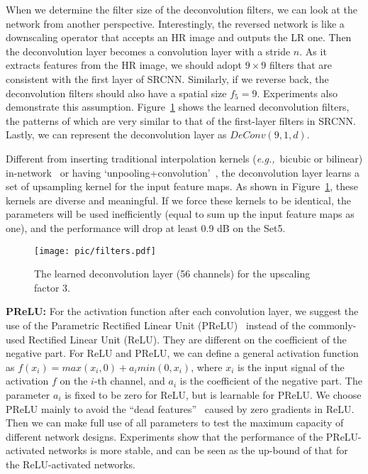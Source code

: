 \documentclass[runningheads]{llncs}
\newcommand{\eg}{\emph{e.g.,}}
\begin{document}
When we determine the filter size of the deconvolution filters, we can look at the network from another perspective. Interestingly, the reversed network is like a downscaling operator that accepts an HR image and outputs the LR one. Then the deconvolution layer becomes a convolution layer with a stride $n$. As it extracts features from the HR image, we should adopt $9\times 9$ filters that are consistent with the first layer of SRCNN. Similarly, if we reverse back, the deconvolution filters should also have a spatial size $f_5=9$. Experiments also demonstrate this assumption. Figure~\ref{fig:filters} shows the learned deconvolution filters, the patterns of which are very similar to that of the first-layer filters in SRCNN.
Lastly, we can represent the deconvolution layer as $DeConv(9,1,d)$.

Different from inserting traditional interpolation kernels (\eg~bicubic or bilinear) in-network~\cite{Long2015} or having `unpooling+convolution'~\cite{dosovitskiy2015learning}, the deconvolution layer learns a set of upsampling kernel for the input feature maps. As shown in Figure~\ref{fig:filters}, these kernels are diverse and meaningful. If we force these kernels to be identical, the parameters will be used inefficiently (equal to sum up the input feature maps as one), and the performance will drop at least 0.9 dB on the Set5.



\begin{figure}[t]
\centering
  \texttt{[image: pic/filters.pdf]}
\caption{The learned deconvolution layer (56 channels) for the upscaling factor 3.}
  \label{fig:filters}
\end{figure}


\noindent
\textbf{PReLU:} For the activation function after each convolution layer, we suggest the use of the Parametric Rectified Linear Unit (PReLU)~\cite{He2015} instead of the commonly-used Rectified Linear Unit (ReLU). They are different on the coefficient of the negative part. For ReLU and PReLU, we can define a general activation function as $f(x_i)=max(x_i,0)+a_imin(0,x_i)$,
where $x_i$ is the input signal of the activation $f$ on the $i$-th channel, and $a_i$ is the coefficient of the negative part. The parameter $a_i$ is fixed to be zero for ReLU, but is learnable for PReLU. We choose PReLU mainly to avoid the ``dead features''~\cite{Zeiler2014} caused by zero gradients in ReLU. Then we can make full use of all parameters to test the maximum capacity of different network designs. Experiments show that the performance of the PReLU-activated networks is more stable, and can be seen as the up-bound of that for the ReLU-activated networks.
\end{document}
